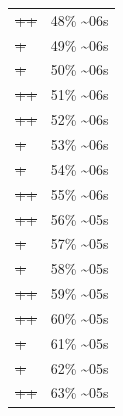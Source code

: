 \documentclass[12pt]{article}
\begin{document}
\begin{center}
\begin{tabular}{ll}
\sout{\sout{\sout{\sout{\sout{\sout{\sout{\sout{\sout{\sout{\sout{++}}}}}}}}}}} & 48\% \textasciitilde{}06s\\
\sout{\sout{\sout{\sout{\sout{\sout{\sout{\sout{\sout{\sout{\sout{\sout{+}}}}}}}}}}}} & 49\% \textasciitilde{}06s\\
\sout{\sout{\sout{\sout{\sout{\sout{\sout{\sout{\sout{\sout{\sout{\sout{+}}}}}}}}}}}} & 50\% \textasciitilde{}06s\\
\sout{\sout{\sout{\sout{\sout{\sout{\sout{\sout{\sout{\sout{\sout{\sout{++}}}}}}}}}}}} & 51\% \textasciitilde{}06s\\
\sout{\sout{\sout{\sout{\sout{\sout{\sout{\sout{\sout{\sout{\sout{\sout{++}}}}}}}}}}}} & 52\% \textasciitilde{}06s\\
\sout{\sout{\sout{\sout{\sout{\sout{\sout{\sout{\sout{\sout{\sout{\sout{\sout{+}}}}}}}}}}}}} & 53\% \textasciitilde{}06s\\
\sout{\sout{\sout{\sout{\sout{\sout{\sout{\sout{\sout{\sout{\sout{\sout{\sout{+}}}}}}}}}}}}} & 54\% \textasciitilde{}06s\\
\sout{\sout{\sout{\sout{\sout{\sout{\sout{\sout{\sout{\sout{\sout{\sout{\sout{++}}}}}}}}}}}}} & 55\% \textasciitilde{}06s\\
\sout{\sout{\sout{\sout{\sout{\sout{\sout{\sout{\sout{\sout{\sout{\sout{\sout{++}}}}}}}}}}}}} & 56\% \textasciitilde{}05s\\
\sout{\sout{\sout{\sout{\sout{\sout{\sout{\sout{\sout{\sout{\sout{\sout{\sout{\sout{+}}}}}}}}}}}}}} & 57\% \textasciitilde{}05s\\
\sout{\sout{\sout{\sout{\sout{\sout{\sout{\sout{\sout{\sout{\sout{\sout{\sout{\sout{+}}}}}}}}}}}}}} & 58\% \textasciitilde{}05s\\
\sout{\sout{\sout{\sout{\sout{\sout{\sout{\sout{\sout{\sout{\sout{\sout{\sout{\sout{++}}}}}}}}}}}}}} & 59\% \textasciitilde{}05s\\
\sout{\sout{\sout{\sout{\sout{\sout{\sout{\sout{\sout{\sout{\sout{\sout{\sout{\sout{++}}}}}}}}}}}}}} & 60\% \textasciitilde{}05s\\
\sout{\sout{\sout{\sout{\sout{\sout{\sout{\sout{\sout{\sout{\sout{\sout{\sout{\sout{\sout{+}}}}}}}}}}}}}}} & 61\% \textasciitilde{}05s\\
\sout{\sout{\sout{\sout{\sout{\sout{\sout{\sout{\sout{\sout{\sout{\sout{\sout{\sout{\sout{+}}}}}}}}}}}}}}} & 62\% \textasciitilde{}05s\\
\sout{\sout{\sout{\sout{\sout{\sout{\sout{\sout{\sout{\sout{\sout{\sout{\sout{\sout{\sout{++}}}}}}}}}}}}}}} & 63\% \textasciitilde{}05s\\

\end{tabular}
\end{center}
\end{document}
